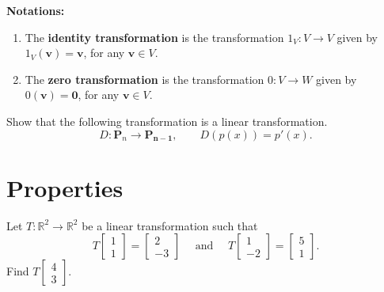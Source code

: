 \documentclass[20pt,a4paper]{extarticle}
\newcommand{\ra}{\rightarrow}
\newcounter{example}
\begin{document}
\textbf{Notations:}
	\begin{enumerate}[label=\Circled{\arabic*}]
		\item The \textbf{identity transformation} is the transformation $1_V : V \ra V$ given by $1_V (\mathbf{v}) = \mathbf{v}$, for any $\mathbf{v} \in V$.
		\item The \textbf{zero transformation} is the transformation $0 : V \ra W$ given by $0 (\mathbf{v}) = \mathbf{0}$, for any $\mathbf{v} \in V$.
	\end{enumerate}

\newpage 


\begin{example}
Show that the following transformation is a linear transformation.
	\[
		D : \mathbf{P}_n \ra \mathbf{P_{n-1}}, \qquad D (p (x)) = p' (x) .
	\]
\end{example}

\begin{solution}

\end{solution}

\newpage 

\section{Properties}

\begin{example}
Let $T : \mathbb{R}^2 \ra \mathbb{R}^2$ be a linear transformation such that
	\[
		T  \begin{bmatrix} 1 \\ 1 \end{bmatrix}  = \begin{bmatrix} 2 \\ -3 \end{bmatrix} \quad \text{ and } \quad T  \begin{bmatrix} 1 \\ -2 \end{bmatrix}  = \begin{bmatrix} 5 \\ 1 \end{bmatrix} .
	\]
Find $T \begin{bmatrix} 4 \\ 3 \end{bmatrix}$.
\end{example}

\begin{solution}

\end{solution}
\end{document}
